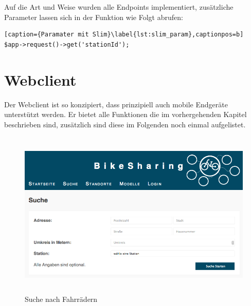 Auf die Art und Weise wurden alle Endpoints implementiert, zusätzliche Parameter lassen sich in der Funktion wie Folgt abrufen:
\begin{lstlisting}[caption={Paramater mit Slim}\label{lst:slim_param},captionpos=b] 
$app->request()->get('stationId');
\end{lstlisting}

\chapter{Webclient}

Der Webclient ist so konzipiert, dass prinzipiell auch mobile Endgeräte unterstützt werden.
Er bietet alle Funktionen die im vorhergehenden Kapitel beschrieben sind, zusätzlich sind diese im Folgenden noch einmal aufgelistet.

\begin{figure}[h]
        \centering
	\includegraphics[height=80mm]{pics/bikesharing_search.png}
	\caption{Suche nach Fahrrädern}
\end{figure}

